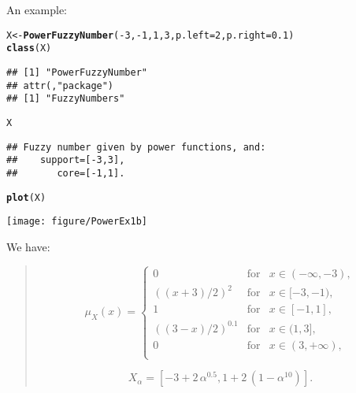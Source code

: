 \documentclass[11pt]{article}\usepackage[]{graphicx}\usepackage[]{color}
\makeatletter
\newcommand{\hlnum}[1]{\textcolor[rgb]{0.686,0.059,0.569}{#1}}%
\newcommand{\hlopt}[1]{\textcolor[rgb]{0,0,0}{#1}}%
\newcommand{\hlstd}[1]{\textcolor[rgb]{0.345,0.345,0.345}{#1}}%
\newcommand{\hlkwb}[1]{\textcolor[rgb]{0.69,0.353,0.396}{#1}}%
\newcommand{\hlkwc}[1]{\textcolor[rgb]{0.333,0.667,0.333}{#1}}%
\newcommand{\hlkwd}[1]{\textcolor[rgb]{0.737,0.353,0.396}{\textbf{#1}}}%
\newenvironment{kframe}{%
 \def\at@end@of@kframe{}%
 \ifinner\ifhmode%
  \def\at@end@of@kframe{\end{minipage}}%
  \begin{minipage}{\columnwidth}%
 \fi\fi%
 \def\FrameCommand##1{\hskip\@totalleftmargin \hskip-\fboxsep
 \colorbox{shadecolor}{##1}\hskip-\fboxsep
     \hskip-\linewidth \hskip-\@totalleftmargin \hskip\columnwidth}%
 \MakeFramed {\advance\hsize-\width
   \@totalleftmargin\z@ \linewidth\hsize
   \@setminipage}}%
 {\par\unskip\endMakeFramed%
 \at@end@of@kframe}
\newenvironment{knitrout}{}{} %
\makeatother
\begin{document}
An example:
\begin{knitrout}\small
{}\color{fgcolor}\begin{kframe}
\begin{alltt}
\hlstd{X} \hlkwb{<-} \hlkwd{PowerFuzzyNumber}\hlstd{(}\hlopt{-}\hlnum{3}\hlstd{,} \hlopt{-}\hlnum{1}\hlstd{,} \hlnum{1}\hlstd{,} \hlnum{3}\hlstd{,} \hlkwc{p.left}\hlstd{=}\hlnum{2}\hlstd{,} \hlkwc{p.right}\hlstd{=}\hlnum{0.1}\hlstd{)}
\hlkwd{class}\hlstd{(X)}
\end{alltt}
\begin{verbatim}
## [1] "PowerFuzzyNumber"
## attr(,"package")
## [1] "FuzzyNumbers"
\end{verbatim}
\begin{alltt}
\hlstd{X}
\end{alltt}
\begin{verbatim}
## Fuzzy number given by power functions, and:
##    support=[-3,3],
##       core=[-1,1].
\end{verbatim}
\begin{alltt}
\hlkwd{plot}\hlstd{(X)}
\end{alltt}
\end{kframe}
\end{knitrout}

\begin{center}
\begin{knitrout}\small
{}\color{fgcolor}

{\centering \texttt{[image: figure/PowerEx1b]} 

}



\end{knitrout}
\end{center}

We have:
\begin{quote}
\[
\mu_{X}(x) = \left\{
\begin{array}{lll}
0      & \text{for} & x\in(-\infty,-3), \\
((x+3)/2)^{2} & \text{for} & x\in[-3,-1), \\
1      & \text{for} & x\in[-1,1], \\
((3-x)/2)^{0.1} & \text{for} & x\in(1,3], \\
0      & \text{for} & x\in(3,+\infty), \\
\end{array}
\right.
\]

\[
{X}_\alpha = [-3+2\,\alpha^{0.5}, 1+2\,(1-\alpha^{10})].
\]
\end{quote}
\end{document}

